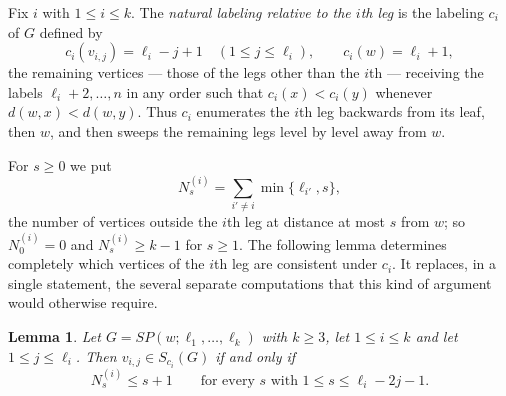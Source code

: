 \documentclass[reqno,10pt]{article}
\newtheorem{lemma}[theorem]{Lemma}
\theoremstyle{definition}
\numberwithin{equation}{section}
\numberwithin{theorem}{section}
\begin{document}
Fix $i$ with $1\le i\le k$. The \emph{natural labeling relative to the $i$th
leg} is the labeling $c_i$ of $G$ defined by
\[
  c_i(v_{i,j})=\ell_i-j+1 \quad(1\le j\le\ell_i),
  \qquad
  c_i(w)=\ell_i+1,
\]
the remaining vertices --- those of the legs other than the $i$th --- receiving
the labels $\ell_i+2,\dots,n$ in any order such that $c_i(x)<c_i(y)$ whenever
$d(w,x)<d(w,y)$. Thus $c_i$ enumerates the $i$th leg backwards from its leaf,
then $w$, and then sweeps the remaining legs level by level away from $w$.

For $s\ge0$ we put
\[
  N^{(i)}_s=\sum_{i'\ne i}\min\{\ell_{i'},s\},
\]
the number of vertices outside the $i$th leg at distance at most $s$ from $w$;
so $N^{(i)}_0=0$ and $N^{(i)}_s\ge k-1$ for $s\ge1$. The following lemma
determines completely which vertices of the $i$th leg are consistent under
$c_i$. It replaces, in a single statement, the several separate computations
that this kind of argument would otherwise require.

\begin{lemma}
\label{lem:natural}
Let $G=SP(w;\ell_1,\dots,\ell_k)$ with $k\ge3$, let $1\le i\le k$ and let
$1\le j\le\ell_i$. Then $v_{i,j}\in S_{c_i}(G)$ if and only if
\begin{equation}
  N^{(i)}_s\le s+1
  \qquad\text{for every } s \text{ with } 1\le s\le \ell_i-2j-1 .
  \label{eq:natcond}
\end{equation}
\end{lemma}
\end{document}
